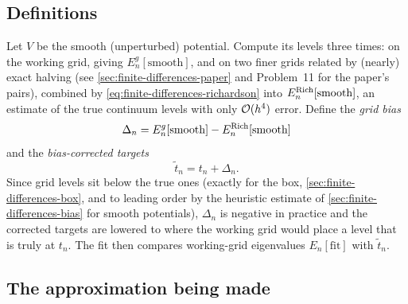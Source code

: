 \subsection{Definitions}

Let $V$ be the smooth (unperturbed) potential. Compute its levels three times: on the working grid, giving $E_n^{g}[\mathrm{smooth}]$, and on two finer grids related by (nearly) exact halving (see \cref{sec:finite-differences-paper} and Problem~11 for the paper's pairs), combined by \eqref{eq:finite-differences-richardson} into $E_n^{\rm Rich}[\mathrm{smooth}]$, an estimate of the true continuum levels with only $\mathcal{O}(h^4)$ error. Define the \emph{grid bias}
\begin{equation}
\Delta_n=E_n^{g}[\mathrm{smooth}]-E_n^{\rm Rich}[\mathrm{smooth}]
\label{eq:finite-differences-Delta}
\end{equation}
and the \emph{bias-corrected targets}
\begin{equation}
\tilde t_n=t_n+\Delta_n.
\label{eq:finite-differences-ttilde}
\end{equation}
Since grid levels sit below the true ones (exactly for the box, \cref{sec:finite-differences-box}, and to leading order by the heuristic estimate of \cref{sec:finite-differences-bias} for smooth potentials), $\Delta_n$ is negative in practice and the corrected targets are lowered to where the working grid would place a level that is truly at $t_n$. The fit then compares working-grid eigenvalues $E_n[\mathrm{fit}]$ with $\tilde t_n$.

\subsection{The approximation being made}

